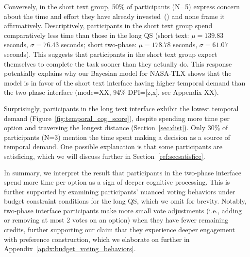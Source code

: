 Conversely, in the short text group, 50\% of participants (N=5) express concern about the time and effort they have already invested~() and none frame it affirmatively. Descriptively, participants in the short text group spend comparatively less time than those in the long QS (short text: $\mu=139.83$ seconds, $\sigma=76.43$ seconds; short two-phase: $\mu=178.78$ seconds, $\sigma=61.07$ seconds). This suggests that participants in the short text group expect themselves to complete the task sooner than they actually do. This response potentially explains why our Bayesian model for NASA-TLX shows that the model is in favor of the short text interface having higher temporal demand than the two-phase interface (mode=XX, 94\% DPI=[z,x], see Appendix XX).

Surprisingly, participants in the long text interface exhibit the lowest temporal demand (Figure~\ref{fig:temporal_cog_score}), despite spending more time per option and traversing the longest distance (Section~\ref{sec:dist}). Only 30\% of participants (N=3) mention the time spent making a decision as a source of temporal demand. One possible explanation is that some participants are satisficing, which we will discuss further in Section~\ref{ref:secsatisfice}.  

In summary, we interpret the result that participants in the two-phase interface spend more time per option as a sign of deeper cognitive processing. This is further supported by examining participants' nuanced voting behaviors under budget constraint conditions for the long QS, which we omit for brevity. Notably, two-phase interface participants make more small vote adjustments (i.e., adding or removing at most 2 votes on an option) when they have fewer remaining credits, further supporting our claim that they experience deeper engagement with preference construction, which we elaborate on further in Appendix~\ref{apdx:budget_voting_behaviors}.

